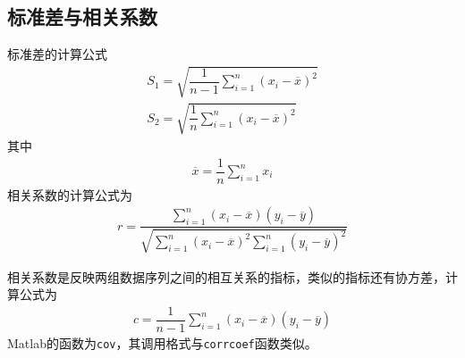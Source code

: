 \subsection{标准差与相关系数}
标准差的计算公式
\begin{align}
	S_1 = \sqrt{\dfrac{1}{n -1} \sum_{i = 1}^{n} \left(x_i - \overline{x}\right)^2}\\
	S_2 =  \sqrt{\dfrac{1}{n} \sum_{i = 1}^{n} \left(x_i - \overline{x}\right)^2}
\end{align}
其中
\begin{align*}
	\overline{x} = \dfrac{1}{n} \sum_{i = 1}^{n} x_i
\end{align*}
相关系数的计算公式为
\begin{align}
	r = \dfrac{\displaystyle \sum_{i = 1}^{n}(x_i - \overline{x})(y_i - \overline{y})}{\displaystyle \sqrt{\sum_{i = 1}^{n}(x_i - \overline{x})^2\sum_{i = 1}^n (y_i - \overline{y})^2}}
\end{align}
\begin{table}[!htb]
	\centering
\end{table}
\newpage

相关系数是反映两组数据序列之间的相互关系的指标，类似的指标还有协方差，计算公式为
\begin{align}
	c = \dfrac{1}{n - 1} \sum_{i = 1}^n (x_i - \overline{x})(y_i - \overline{y})
\end{align}
Matlab的函数为\lstinline|cov|，其调用格式与\lstinline|corrcoef|函数类似。
\vspace*{0.5em}


